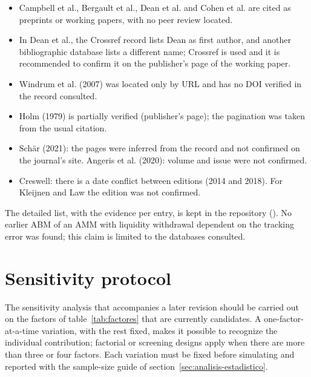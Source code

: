 \begin{itemize}
  \item Campbell et al., Bergault et al., Dean et al. and Cohen et al. are cited as preprints or working papers, with no peer review located.
  \item In Dean et al., the Crossref record lists Dean as first author, and another bibliographic database lists a different name; Crossref is used and it is recommended to confirm it on the publisher's page of the working paper.
  \item Windrum et al. (2007) was located only by URL and has no DOI verified in the record consulted.
  \item Holm (1979) is partially verified (publisher's page); the pagination was taken from the usual citation.
  \item Schär (2021): the pages were inferred from the record and not confirmed on the journal's site. Angeris et al. (2020): volume and issue were not confirmed.
  \item Creswell: there is a date conflict between editions (2014 and 2018). For Kleijnen and Law the edition was not confirmed.
\end{itemize}

The detailed list, with the evidence per entry, is kept in the repository (). No earlier ABM of an AMM with liquidity withdrawal dependent on the tracking error was found; this claim is limited to the databases consulted.

\section{Sensitivity protocol}
\label{sec:sensibilidad}

The sensitivity analysis that accompanies a later revision should be carried out on the factors of table~\ref{tab:factores} that are currently candidates. A one-factor-at-a-time variation, with the rest fixed, makes it possible to recognize the individual contribution; factorial or screening designs \cite{morris1991factorial,saltelli2010variance} apply when there are more than three or four factors. Each variation must be fixed before simulating and reported with the sample-size guide of section~\ref{sec:analisis-estadistico}.
